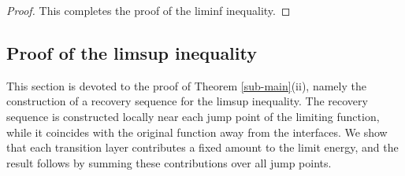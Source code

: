 \documentclass[12pt]{article}
\numberwithin{equation}{section}
\begin{document}
\begin{proof}
This completes the proof of the liminf inequality.
\end{proof}
\subsection{Proof of the limsup inequality}
This section is devoted to the proof of Theorem \ref{sub-main}(ii), namely the construction of a recovery sequence for the limsup inequality. The recovery sequence is constructed locally near each jump point of the limiting function, while it coincides with the original function away from the interfaces. We show that each transition layer contributes a fixed amount to the limit energy, and the result follows by summing these contributions over all jump points.
\end{document}
